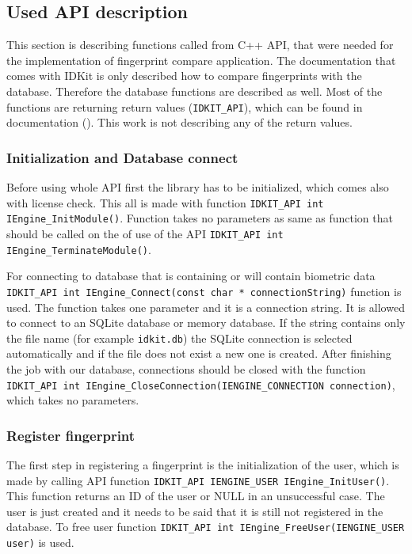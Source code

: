 \label{API}
\subsection{Used API description}
This section is describing functions called from C++ API, that were needed for the implementation of fingerprint compare application. The documentation that comes with IDKit is only described how to compare fingerprints with the database. Therefore the database functions are described as well. Most of the functions are returning return values (\texttt{IDKIT\_API}), which can be found in documentation (\cite{idkitsdk}). This work is not describing any of the return values.

\subsubsection{Initialization and Database connect}
Before using whole API first the library has to be initialized, which comes also with license check. This all is made with function \texttt{IDKIT\_API int IEngine\_InitModule()}. Function takes no parameters as same as function that should be called on the of use of the API \texttt{IDKIT\_API int IEngine\_TerminateModule()}. 

For connecting to database that is containing or will contain biometric data \texttt{IDKIT\_API int IEngine\_Connect(const char * connectionString)} function is used. The function takes one parameter and it is a connection string. It is allowed to connect to an SQLite database or memory database. If the string contains only the file name (for example \texttt{idkit.db}) the SQLite connection is selected automatically and if the file does not exist a new one is created. After finishing the job with our database, connections should be closed with the function \texttt{IDKIT\_API int IEngine\_CloseConnection(IENGINE\_CONNECTION con\-nection)}, which takes no parameters.

\subsubsection{Register fingerprint}
The first step in registering a fingerprint is the initialization of the user, which is made by calling API function \texttt{IDKIT\_API IENGINE\_USER IEngine\_InitUser()}. This function returns an ID of the user or NULL in an unsuccessful case. The user is just created and it needs to be said that it is still not registered in the database. To free user function \texttt{IDKIT\_API int IEngine\_FreeUser(IENGINE\_USER user)} is used.

